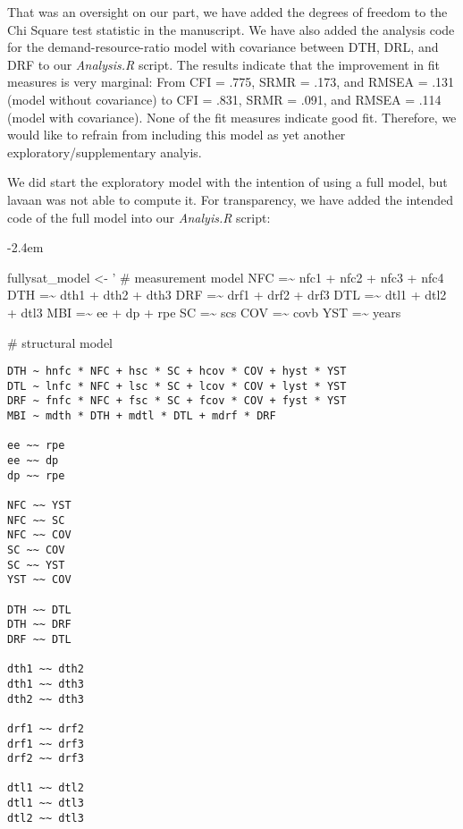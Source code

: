 \documentclass[draft]{article}
\renewenvironment{quote}{\begin{fquote}\advance\leftmargini -2.4em\begin{oldquote}}{\end{oldquote}\end{fquote}}
\newenvironment{fquote}
  {\def\FrameCommand{
	\fboxsep=0.6em %
	\fcolorbox{black}{white}}%
    \MakeFramed {\advance\hsize-2\width \FrameRestore}
    \begin{minipage}{\linewidth}
  }
  {\end{minipage}\endMakeFramed}
\begin{document}
That was an oversight on our part, we have added the degrees of freedom to the Chi Square test statistic in the manuscript.
We have also added the analysis code for the demand-resource-ratio model with covariance between DTH, DRL, and DRF to our \emph{Analysis.R} script.
The results indicate that the improvement in fit measures is very marginal: From CFI = .775, SRMR = .173, and RMSEA = .131 (model without covariance) to CFI = .831, SRMR = .091, and RMSEA = .114 (model with covariance).
None of the fit measures indicate good fit.
Therefore, we would like to refrain from including this model as yet another exploratory/supplementary analyis.


We did start the exploratory model with the intention of using a full model, but lavaan was not able to compute it.
For transparency, we have added the intended code of the full model into our \emph{Analyis.R} script:

\begin{quote}
fullysat\_model \textless- '
\# measurement model
NFC =\textasciitilde{} nfc1 + nfc2 + nfc3 + nfc4
DTH =\textasciitilde{} dth1 + dth2 + dth3
DRF =\textasciitilde{} drf1 + drf2 + drf3
DTL =\textasciitilde{} dtl1 + dtl2 + dtl3
MBI =\textasciitilde{} ee + dp + rpe
SC =\textasciitilde{} scs
COV =\textasciitilde{} covb
YST =\textasciitilde{} years
\end{quote}

\# structural model

\begin{verbatim}
DTH ~ hnfc * NFC + hsc * SC + hcov * COV + hyst * YST
DTL ~ lnfc * NFC + lsc * SC + lcov * COV + lyst * YST
DRF ~ fnfc * NFC + fsc * SC + fcov * COV + fyst * YST
MBI ~ mdth * DTH + mdtl * DTL + mdrf * DRF

ee ~~ rpe
ee ~~ dp
dp ~~ rpe

NFC ~~ YST
NFC ~~ SC
NFC ~~ COV
SC ~~ COV
SC ~~ YST
YST ~~ COV

DTH ~~ DTL
DTH ~~ DRF
DRF ~~ DTL

dth1 ~~ dth2
dth1 ~~ dth3
dth2 ~~ dth3

drf1 ~~ drf2
drf1 ~~ drf3
drf2 ~~ drf3

dtl1 ~~ dtl2
dtl1 ~~ dtl3
dtl2 ~~ dtl3
\end{verbatim}
\end{document}
